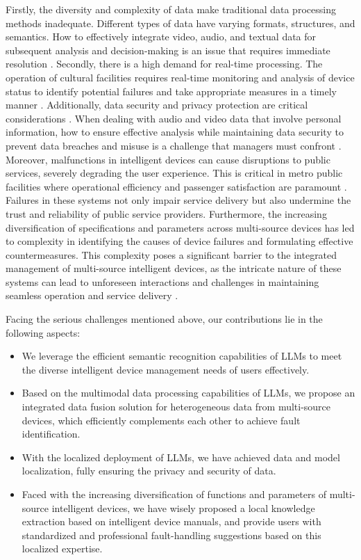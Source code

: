 \documentclass[preprint,12pt]{elsarticle}
\begin{document}
Firstly, the diversity and complexity of data make traditional data processing methods inadequate. Different types of data have varying formats, structures, and semantics. How to effectively integrate video, audio, and textual data for subsequent analysis and decision-making is an issue that requires immediate resolution \cite{Xu202468,Wu202421072,li2023toward,li2023when}.
Secondly, there is a high demand for real-time processing. The operation of cultural facilities requires real-time monitoring and analysis of device status to identify potential failures and take appropriate measures in a timely manner \cite{Bi2023}. Additionally, data security and privacy protection are critical considerations \cite{wang2019survey,makhdoom2019blockchain,yu2020survey}.  When dealing with audio and video data that involve personal information, how to ensure effective analysis while maintaining data security to prevent data breaches and misuse is a challenge that managers must confront \cite{Xu202468,Thakur202413212,wang2023adversarial}.
Moreover, malfunctions in intelligent devices can cause disruptions to public services, severely degrading the user experience. This is critical in metro public facilities where operational efficiency and passenger satisfaction are paramount \cite{Thakur202413212}. Failures in these systems not only impair service delivery but also undermine the trust and reliability of public service providers. Furthermore, the increasing diversification of specifications and parameters across multi-source devices has led to complexity in identifying the causes of device failures and formulating effective countermeasures. This complexity poses a significant barrier to the integrated management of multi-source intelligent devices, as the intricate nature of these systems can lead to unforeseen interactions and challenges in maintaining seamless operation and service delivery \cite{Bi2023}.



Facing the serious challenges mentioned above, our contributions lie in the following aspects:
\begin{itemize}
	\item We leverage the efficient semantic recognition capabilities of LLMs to meet the diverse intelligent device management needs of users effectively.
	\item Based on the multimodal data processing capabilities of LLMs, we propose an integrated data fusion solution for heterogeneous data from multi-source devices, which efficiently complements each other to achieve fault identification.
	\item With the localized deployment of LLMs, we have achieved data and model localization, fully ensuring the privacy and security of data.
	\item Faced with the increasing diversification of functions and parameters of multi-source intelligent devices, we have wisely proposed a local knowledge extraction based on intelligent device manuals, and provide users with standardized and professional fault-handling suggestions based on this localized expertise.
\end{itemize}
\end{document}

